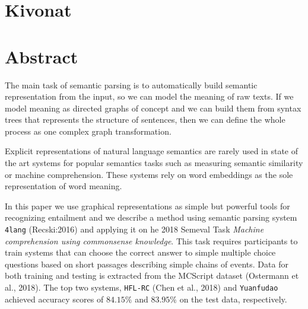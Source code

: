 \chapter*{Kivonat}



\vfill

\chapter*{Abstract}
The main task of semantic parsing is to automatically build semantic representation from the input, so we can model the meaning
of raw texts. If we model meaning as directed graphs of concept and we can build them from syntax trees that represents the structure of 
sentences, then we can define the whole process as one complex graph transformation.

Explicit representations of natural language semantics
are rarely used in state of the art systems
for popular semantics tasks such as measuring semantic
similarity or machine comprehension. These systems rely on
word embeddings
as the sole representation of word meaning.

In this paper we use graphical representations as simple but powerful tools for recognizing entailment and we describe a method using semantic parsing system \texttt{4lang} (Recski:2016) and applying it on
he 2018 Semeval Task \textit{Machine comprehension using commonsense
knowledge}. This task 
requires participants
to train systems that can choose the correct
answer to simple multiple choice questions
based on short passages describing simple chains
of events. Data for both training and testing is extracted
from the MCScript dataset (Ostermann
et al., 2018). The top two systems, \texttt{HFL-RC} (Chen
et al., 2018) and \texttt{Yuanfudao}
achieved accuracy scores of $84.15\%$ and $83.95\%$
on the test data, respectively.

